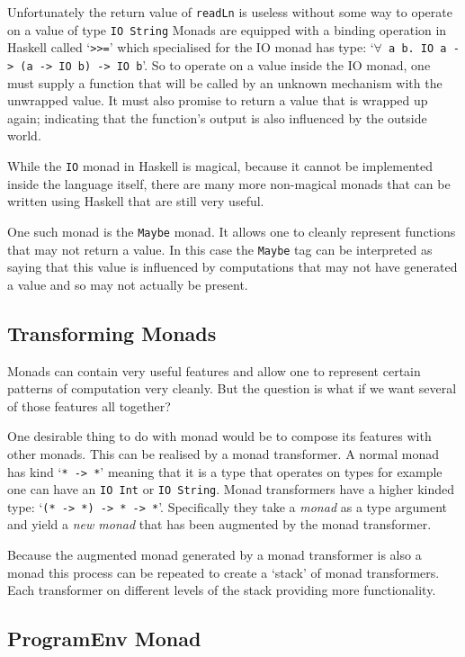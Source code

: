 \documentclass[]{article}
\newcommand{\function}[1]{\texttt{#1}}
\newcommand{\type}[1]{\texttt{#1}}
\begin{document}
Unfortunately the return value of \function{readLn} is useless without some
way to operate on a value of type \type{IO String} Monads are equipped with a
binding operation in Haskell called `\function{>>=}' which specialised for the
IO monad has type: `\type{$\forall$~a~b.~IO~a~->~(a~->~IO~b)~->~IO~b}'. So to
operate on a value inside the IO monad, one must supply a function that will
be called by an unknown mechanism with the unwrapped value. It must also
promise to return a value that is wrapped up again; indicating that the
function's output is also influenced by the outside world.

While the \type{IO} monad in Haskell is magical, because it cannot
be implemented inside the language itself, there are many
more non-magical monads that can be written using Haskell that are
still very useful.

One such monad is the \type{Maybe} monad. It allows one to cleanly represent
functions that may not return a value. In this case the \type{Maybe} tag can
be interpreted as saying that this value is influenced by computations that
may not have generated a value and so may not actually be present.

\subsection{Transforming Monads}
\label{discussion:monadtrans}

Monads can contain very useful features and allow one to represent
certain patterns of computation very cleanly. But the question is
what if we want several of those features all together?

One desirable thing to do with monad would be to compose its features with
other monads. This can be realised by a monad transformer. A normal monad has
kind `\type{* -> *}' meaning that it is a type that operates on types for
example one can have an \type{IO Int} or \type{IO String}. Monad transformers
have a higher kinded type: `\type{(* -> *) -> * -> *}'. Specifically they take
a \emph{monad} as a type argument and yield a \emph{new monad} that has
been augmented by the monad transformer.

Because the augmented monad generated by a monad transformer is also a monad
this process can be repeated to create a `stack' of monad transformers. Each
transformer on different levels of the stack providing more functionality.

\subsection{ProgramEnv Monad}
\end{document}

